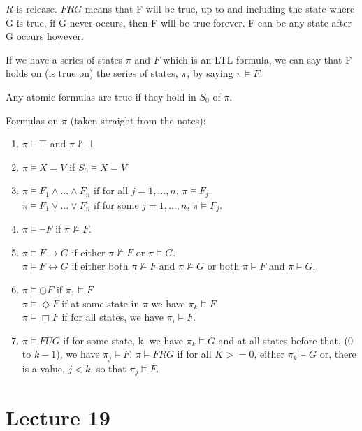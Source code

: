 \documentclass[11pt,a4paper]{article}
\begin{document}
\vspace{5pt}
$R$ is release. $F R G$ means that F will be true, up to and including the state where G is true, if G never occurs, then F will be true forever. F can be any state after G occurs however.

\vspace{5pt}
If we have a series of states $\pi$ and $F$ which is an LTL formula, we can say that F holds on (is true on) the series of states, $\pi$, by saying
$\pi \models F$.

Any atomic formulas are true if they hold in $S_0$ of $\pi$.

Formulas on $\pi$ (taken straight from the notes):

\begin{enumerate}
\item $\pi \models \top$ and $\pi \not\models \bot$
\item $\pi \models X = V$ if $S_0 \models X = V$
\item $\pi \models F_1 \wedge ... \wedge F_n$ if for all $j = 1,...,n$, $\pi \models F_j$.
\\$\pi \models F_1 \vee ... \vee F_n$ if for some $j = 1,...,n$, $\pi \models F_j$.
\item $\pi \models \neg F$ if $\pi \not\models F$.
\item $\pi \models F \rightarrow G$ if either $\pi \not\models F$ or $\pi \models G$.
\\$\pi \models F \leftrightarrow G$ if either both $\pi \not\models F$ and $\pi \not\models G$ or both $\pi \models F$ and $\pi \models G$.
\item $\pi \models \bigcirc F$ if $\pi _1 \models F$
\\$\pi \models \Diamond F$ if at some state in $\pi$ we have $\pi _k \models F$.
\\$\pi \models \Box F$ if for all states, we have $\pi _i \models F$.
\item $\pi \models F U G$ if for some state, k, we have $\pi _k \models G$ and at all states before that, ($0$ to $k-1$), we have $\pi _j \models F$.
$\pi \models F R G$ if for all $K >= 0$, either $\pi _k \models G$ or, there is a value, $j<k$, so that $\pi _j \models F$.

\end{enumerate}

\section{Lecture 19}
\end{document}
